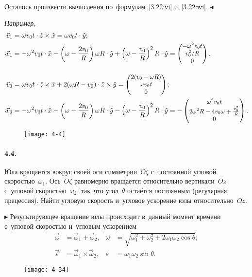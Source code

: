 \documentclass{weekly}
\begin{document}
Осталось произвести вычисления по~формулам~\eqref{3.22:vi}
и~\eqref{3.22:wi}. \hfill $\blacktriangleleft$

\textsl{Например,}
\begin{align}
    \vec v_1 &= \omega v_0 t \cdot \hat z \times \hat x
        = \omega v_0 t \cdot \hat y; \\
    \vec w_1 &= -\omega^2 v_0 t \cdot \hat x -
            \left(\omega - \frac{2v_0}{R}\right)\omega R \cdot \hat y+
            \left(\omega - \frac{v_0}{R}\right)^2 R \cdot \hat y
        = \small\begin{pmatrix}-\omega^2 v_0 t\\v_0^2/R\\0\end{pmatrix}.
\\[2ex]
    \vec v_3 &= \omega v_0 t \cdot \hat z \times \hat x +
            2(\omega R - v_0) \cdot \hat z \times \hat y
        = \small\begin{pmatrix}2(v_0 - \omega R)\\\omega v_0 t\\0\end{pmatrix}; \\
    \vec w_3 &= -\omega^2 v_0 t \cdot \hat x -
            \left(\omega - \frac{2v_0}{R}\right)\omega R \cdot \hat y-
            \left(\omega - \frac{v_0}{R}\right)^2 R \cdot \hat y
        = -\small\begin{pmatrix}\omega^2 v_0 t\\2\omega^2 R - 4v_0 \omega +
            \frac{v_0^2}{R}\\0\end{pmatrix}.
\end{align}


\bigskip
\begin{wrapfigure}[6]{r}{3.3cm}\vspace{-6mm}
    \texttt{[image: 4-4]}
\end{wrapfigure}
\paragraph{4.4.} Юла вращается вокруг своей оси симметрии~$O\zeta$
с~постоянной угловой скоростью~$\omega_1$. Ось~$O\zeta$
равномерно вращается относительно вертикали~$Oz$ с~угловой
скоростью~$\omega_2$, так~что угол~$\theta$ остаётся постоянным
(регулярная прецессия). Найти угловую скорость и~угловое ускорение
юлы относительно~$Oz$.

$\blacktriangleright$ Результирующее вращение юлы происходит
в~данный момент времени с~угловой скоростью и~угловым ускорением
\begin{align*}
    \vec\omega &= \vec\omega_1 + \vec\omega_2, &
    \omega &= \sqrt{\omega_1^2 + \omega_2^2 +
            2\omega_1\omega_2 \cos\theta};
\\\tag*{$\blacktriangleleft$}
    \vec\varepsilon &= \vec\omega_1 \times \vec\omega_2, &
    \varepsilon &= \omega_1 \omega_2 \sin\theta.
\end{align*}


\clearpage
\begin{wrapfigure}[7]{r}{5.5cm}\vspace{3mm}
    \texttt{[image: 4-34]}
\end{wrapfigure}
\end{document}

